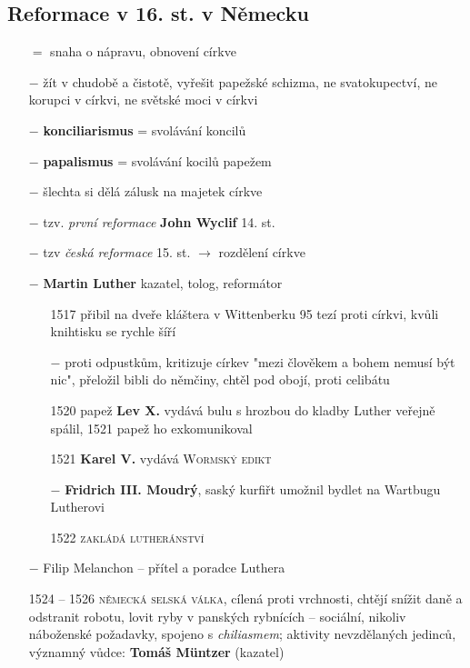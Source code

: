 \documentclass{article}
\begin{document}
\subsection*{Reformace v 16. st. v Německu}
\begin{itemize}
    \vspace{-0.5em}
    \setlength\itemsep{0.15em}
    \item[$=$] snaha o nápravu, obnovení církve
    \item[$-$] žít v chudobě a čistotě, vyřešit papežské schizma, ne svatokupectví, ne korupci v církvi, ne světské moci v církvi
    \item[$-$] \textbf{konciliarismus} = svolávání koncilů
    \item[$-$] \textbf{papalismus} = svolávání kocilů papežem
    \item[$-$] šlechta si dělá zálusk na majetek církve
    \item[$-$] tzv. \textit{první reformace} \textbf{John Wyclif} 14. st.
    \item[$-$] tzv \textit{česká reformace} 15. st. $\rightarrow$ rozdělení církve
    \item[$-$] \textbf{Martin Luther} kazatel, tolog, reformátor
    \begin{itemize}
        \vspace{-0.5em}
        \setlength\itemsep{0.15em}
        \item[1517] přibil na dveře kláštera v Wittenberku 95 tezí proti církvi, kvůli knihtisku se rychle šíří
        \item[$-$] proti odpustkům, kritizuje církev "mezi člověkem a bohem nemusí být nic", přeložil bibli do němčiny, chtěl pod obojí, proti celibátu
        \item[1520] papež \textbf{Lev X.} vydává bulu s hrozbou do kladby \implies Luther veřejně spálil, 1521 papež ho exkomunikoval
        \item[1521] \textbf{Karel V.} vydává \textsc{Wormský edikt}
        \item[$-$] \textbf{Fridrich III. Moudrý}, saský kurfiřt umožnil bydlet na Wartbugu Lutherovi
        \item[1522] \textsc{zakládá lutheránství}
    \end{itemize}
    \item[$-$] Filip Melanchon -- přítel a poradce Luthera
    \item[1524 -- 1526] \textsc{německá selská válka}, cílená proti vrchnosti, chtějí snížit daně a odstranit robotu, lovit ryby v panských rybnících -- sociální, nikoliv náboženské požadavky, spojeno s \textit{chiliasmem}; aktivity nevzdělaných jedinců, významný vůdce: \textbf{Tomáš Müntzer} (kazatel)

\end{itemize}
\end{document}
